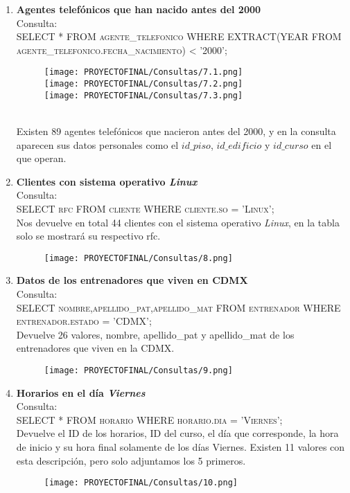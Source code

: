 \documentclass[12pt,letterpaper]{article}
\begin{document}
\begin{enumerate}
   \newpage 
    \item \textbf{Agentes telefónicos que han nacido antes del 2000} \\
     Consulta:\\ \textsc{ SELECT * FROM agente\_telefonico WHERE EXTRACT(YEAR FROM agente\_telefonico.fecha\_nacimiento) < '2000';}
    \begin{figure}[h]
        \centering
        \texttt{[image: PROYECTOFINAL/Consultas/7.1.png]}\\
         \texttt{[image: PROYECTOFINAL/Consultas/7.2.png]}\\          \texttt{[image: PROYECTOFINAL/Consultas/7.3.png]}
    \end{figure}\\
    Existen 89 agentes telefónicos que nacieron antes del 2000, y en la consulta aparecen sus datos personales como el $id\_piso$, $id\_edificio$ y $id\_curso$ en el que operan.
    
    \item \textbf{Clientes con sistema operativo \textit{Linux}}\\
    Consulta:\\ \textsc{ SELECT rfc FROM cliente WHERE cliente.so = 'Linux';}\\ Nos devuelve en total 44 clientes con el  sistema operativo \textit{Linux}, en la tabla solo se mostrará su respectivo rfc.
    \begin{figure}[h]
        \centering
        \texttt{[image: PROYECTOFINAL/Consultas/8.png]}
    \end{figure}
    \item \textbf{Datos de los entrenadores que viven en CDMX}\\
  Consulta:\\  \textsc{ SELECT nombre,apellido\_pat,apellido\_mat FROM entrenador WHERE entrenador.estado = 'CDMX';} \\ Devuelve 26 valores, nombre, apellido\_pat y apellido\_mat de los entrenadores que viven en la CDMX.  \begin{figure}[h!]
        \centering
        \texttt{[image: PROYECTOFINAL/Consultas/9.png]}
    \end{figure}

    \item \textbf{Horarios en el día \textit{Viernes}} \\
    Consulta:\\ \textsc{ SELECT * FROM horario WHERE horario.dia = 'Viernes';} \\Devuelve el ID de los horarios, ID del curso, el día que corresponde, la hora de inicio y su hora final solamente de los días Viernes. Existen 11 valores con esta descripción, pero solo adjuntamos los 5 primeros.
     \begin{figure}[h]
         \centering
         \texttt{[image: PROYECTOFINAL/Consultas/10.png]}
     \end{figure}



\end{enumerate}
\end{document}
